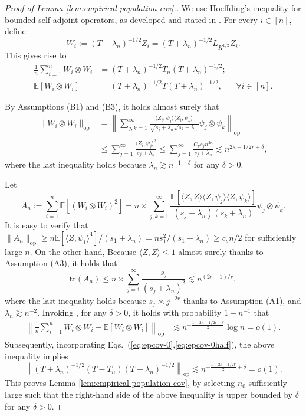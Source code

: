 \documentclass[11pt,a4paper]{article}
\newcommand{\tr}{\mathrm{tr}}
\theoremstyle{definition}
\theoremstyle{plain}
\theoremstyle{remark}
\newcommand{\op}{\mathrm{op}}
\begin{document}
\begin{proof}[Proof of Lemma \ref{lem:empirical-population-cov}.]
We use Hoeffding's inequality for bounded self-adjoint operators, as developed and stated in \citep{minsker2017some}.
For every $i\in[n]$, define
$$
W_i := (T+\lambda_n)^{-1/2}Z_i = (T+\lambda_n)^{-1/2}L_{K^{1/2}}Z_i.
$$
This gives rise to
\begin{align}
\frac{1}{n}\sum_{i=1}^n W_i\otimes W_i &= (T+\lambda_n )^{-1/2}T_n (T+\lambda_n )^{-1/2};\label{eq:epcov-0}\\
\mathbb E[W_i\otimes W_i] &= (T+\lambda_n)^{-1/2} T (T+\lambda_n )^{-1/2}, \;\;\;\;\;\;\forall i\in[n]\label{eq:epcov-0half}.
\end{align}

By Assumptions (B1) and (B3), it holds almost surely that 
\begin{align}
\|W_i\otimes W_i\|_\op&=\left\|\sum_{j,k=1}^{\infty}\frac{\langle Z_i,\psi_j\rangle\langle Z_i,\psi_k\rangle}{\sqrt{s_j+\lambda_n}\sqrt{s_k+\lambda_n}}\psi_j\otimes\psi_k\right\|_\op\nonumber\\
&\leq \sum_{j=1}^{\infty}\frac{\langle Z_i,\psi_j\rangle^2}{s_j+\lambda_n} \leq \sum_{j=1}^{\infty} \frac{C_\nu s_j n^{2\kappa}}{s_j+\lambda_n}  \lesssim n^{2\kappa+1/2r+\delta},
\label{eq:proof-epcov-1}
\end{align}
where the last inequality holds because $\lambda_n\gtrsim n^{-1-\delta}$ for any $\delta>0$.

Let 
$$
A_n := \sum_{i=1}^n\mathbb E[(W_i\otimes W_i)^2] =n\times\sum_{j,k=1}^{\infty}\frac{\mathbb E[\langle Z,Z\rangle\langle Z,\psi_j\rangle\langle Z,\psi_k\rangle]}{(s_j+\lambda_n)(s_k+\lambda_n)}\psi_j\otimes \psi_k.
$$
It is easy to verify that $\|A_n\|_\op \geq n\mathbb E[\langle Z,\psi_1\rangle^4]/(s_1+\lambda_n)=ns_1^2/(s_1+\lambda_n)\geq c_sn/2$ for sufficiently large $n$. 
On the other hand, Because $\langle Z,Z\rangle\leq 1$ almost surely thanks to Assumption (A3), it holds that
\begin{equation}
\tr(A_n) \leq n\times \sum_{j=1}^{\infty} \frac{s_j}{(s_j+\lambda_n)^2} \lesssim n^{(2r+1)/r},
\label{eq:proof-epcov-2}
\end{equation}
where the last inequality holds because $s_j\asymp j^{-2r}$ thanks to Assumption (A1), and $\lambda_n\gtrsim n^{-2}$.
Invoking \citep[Theorem 3.1]{minsker2017some}, for any $\delta>0$, it holds with probability $1-n^{-1}$ that
\begin{align*}
\left\|\frac{1}{n}\sum_{i=1}^n W_i\otimes W_i-\mathbb E[W_i\otimes W_i]\right\|_\op &\lesssim n^{-\frac{1-2\kappa-1/2r-\delta}{2}}\log n = o(1). 
\end{align*}
Subsequently, incorporating Eqs.~(\ref{eq:epcov-0},\ref{eq:epcov-0half}), the above inequality implies
$$
\left\|(T+\lambda_n)^{-1/2}(T-T_n)(T+\lambda_n)^{-1/2}\right\|_\op \lesssim n^{-\frac{1-2\kappa-1/2r}{2}+\delta} = o(1).
$$
This proves Lemma \ref{lem:empirical-population-cov}, by selecting $n_0$ sufficiently large such that the right-hand side of the above inequality is upper bounded by $\delta$ for any $\delta>0$.
\end{proof}
\end{document}
